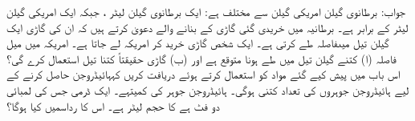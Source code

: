 جواب: 
برطانوی  گیلن امریکی  گیلن سے مختلف ہے: ایک برطانوی  گیلن  لیٹر ، جبکہ ایک امریکی   
گیلن  لیٹر کے برابر ہے۔ برطانیہ میں خریدی گئی  گاڑی  کے بنانے والے دعویٰ کرتے ہیں کہ  ان کی گاڑی  ایک گیلن
 تیل  میںفاصلہ طے کرتی ہے۔ ایک شخص  گاڑی خرید کر امریکہ لے جاتا ہے۔ امریکہ میں  میل فاصلہ  (ا) کتنے گیلن تیل میں طے ہونا متوقع ہے اور  (ب) گاڑی حقیقتاً کتنا تیل استعمال کرے گی؟ 
اس باب میں پیش کیے گئے مواد کو استعمال کرتے ہوئے دریافت کریں کہہائیڈروجن حاصل کرنے کے لیے ہائیڈروجن جوہروں کی تعداد کتنی ہوگی۔  ہائیڈروجن جوہر کی کمیتہے۔ 
ایک ڈرمی جس کی لمبائی دو   فٹ ہے کا حجم لیٹر ہے۔ اس کا رداسمیں کیا  ہوگا؟ 

